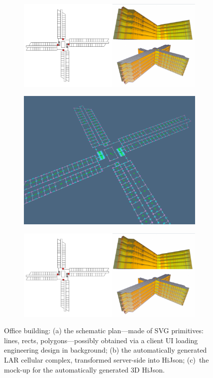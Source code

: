 \documentclass{sig-alternate}
\begin{document}
\begin{figure}[tbh]
 \centering
 ~
 \begin{subfigure}[b]{0.27\linewidth}
 \includegraphics[width=\textwidth]{../images/sogei-a} 
 \end{subfigure}
\hfill
 \begin{subfigure}[b]{0.33\linewidth}
 \includegraphics[width=\textwidth]{../images/building} 
 \end{subfigure}
\hfill
 \begin{subfigure}[b]{0.27\linewidth}
 \includegraphics[width=\textwidth]{../images/sogei-b}
 \end{subfigure}
 \caption{Office building: 
 (a) the schematic plan---made of SVG primitives: lines, rects, polygons---possibly obtained via a client UI loading engineering design in background;
 (b) the automatically generated LAR cellular complex, transformed server-side into HiJson; 
 (c)~the mock-up for the automatically generated 3D HiJson.
 }
 \label{fig:sogei}
\end{figure}
\end{document}
